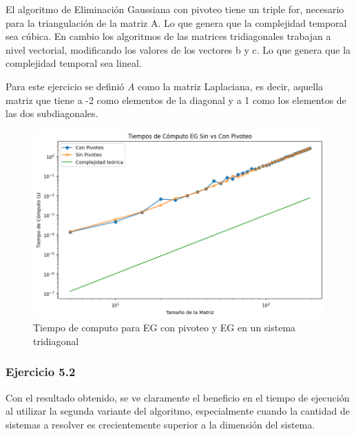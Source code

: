     El algoritmo de Eliminación Gaussiana con pivoteo tiene un triple for, necesario para la triangulación de la matriz A. Lo que genera que la complejidad temporal sea cúbica. En cambio los algoritmos de las matrices tridiagonales trabajan a nivel vectorial, modificando los valores de los vectores b y c. Lo que genera que la complejidad temporal sea lineal.

    Para este ejercicio se definió \textit{A} como la matriz Laplaciana, es decir, aquella matriz que tiene a -2 como elementos de la diagonal y a 1 como los elementos de las dos subdiagonales.

    \begin{figure}[H]
    \centerline{\includegraphics[scale=0.45]{./img/tiempos_EGsinVsConPivoteo.png}}
    \caption{Tiempo de computo para EG con pivoteo y EG en un sistema tridiagonal}
    \label{result_ej5}
    \end{figure}
\fi


\iffalse
    \subsubsection{Ejercicio 5.2}

    Con el resultado obtenido, se ve claramente el beneficio en el tiempo de ejecución al utilizar la segunda variante del algoritmo, especialmente cuando la cantidad de sistemas a resolver es crecientemente superior a la dimensión del sistema.


